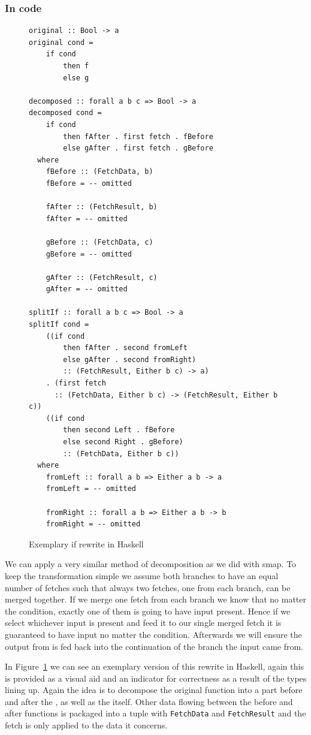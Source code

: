 \subsubsection{In code}

\begin{figure}
\begin{verbatim}
original :: Bool -> a
original cond =
    if cond
        then f
        else g

decomposed :: forall a b c => Bool -> a
decomposed cond =
    if cond
        then fAfter . first fetch . fBefore
        else gAfter . first fetch . gBefore
  where
    fBefore :: (FetchData, b)
    fBefore = -- omitted

    fAfter :: (FetchResult, b)
    fAfter = -- omitted

    gBefore :: (FetchData, c)
    gBefore = -- omitted

    gAfter :: (FetchResult, c)
    gAfter = -- omitted

splitIf :: forall a b c => Bool -> a
splitIf cond =
    ((if cond
        then fAfter . second fromLeft
        else gAfter . second fromRight)
        :: (FetchResult, Either b c) -> a)
    . (first fetch
      :: (FetchData, Either b c) -> (FetchResult, Either b c))
    ((if cond
        then second Left . fBefore
        else second Right . gBefore)
        :: (FetchData, Either b c))
  where
    fromLeft :: forall a b => Either a b -> a
    fromLeft = -- omitted

    fromRight :: forall a b => Either a b -> b
    fromRight = -- omitted
\end{verbatim}
\caption{Exemplary if rewrite in Haskell}
\label{fig:if-rewrite-in-code}
\end{figure}

We can apply a very similar method of decomposition as we did with smap.
To keep the transformation simple we assume both branches to have an equal number of fetches such that always two fetches, one from each branch, can be merged together.
If we merge one fetch from each branch we know that no matter the condition, exactly one of them is going to have input present.
Hence if we select whichever input is present and feed it to our single merged fetch it is guaranteed to have input no matter the condition.
Afterwards we will ensure the output from \fetch{} is fed back into the continuation of the branch the input came from.

In Figure~\ref{fig:if-rewrite-in-code} we can see an exemplary version of this rewrite in Haskell, again this is provided as a visual aid and an indicator for correctness as a result of the types lining up.
Again the idea is to decompose the original function into a part before and after the \fetch{}, as well as the \fetch{} itself.
Other data flowing between the before and after functions is packaged into a tuple with \texttt{FetchData} and \texttt{FetchResult} and the fetch is only applied to the data it concerns.

